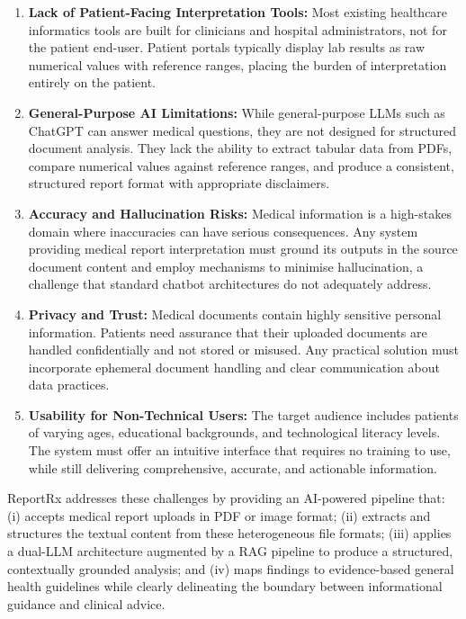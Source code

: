 \documentclass[12pt,a4paper]{report}
\begin{document}
\begin{enumerate}
    \item \textbf{Lack of Patient-Facing Interpretation Tools:} Most existing healthcare informatics tools are built for clinicians and hospital administrators, not for the patient end-user. Patient portals typically display lab results as raw numerical values with reference ranges, placing the burden of interpretation entirely on the patient.
    \item \textbf{General-Purpose AI Limitations:} While general-purpose LLMs such as ChatGPT can answer medical questions, they are not designed for structured document analysis. They lack the ability to extract tabular data from PDFs, compare numerical values against reference ranges, and produce a consistent, structured report format with appropriate disclaimers.
    \item \textbf{Accuracy and Hallucination Risks:} Medical information is a high-stakes domain where inaccuracies can have serious consequences. Any system providing medical report interpretation must ground its outputs in the source document content and employ mechanisms to minimise hallucination, a challenge that standard chatbot architectures do not adequately address.
    \item \textbf{Privacy and Trust:} Medical documents contain highly sensitive personal information. Patients need assurance that their uploaded documents are handled confidentially and not stored or misused. Any practical solution must incorporate ephemeral document handling and clear communication about data practices.
    \item \textbf{Usability for Non-Technical Users:} The target audience includes patients of varying ages, educational backgrounds, and technological literacy levels. The system must offer an intuitive interface that requires no training to use, while still delivering comprehensive, accurate, and actionable information.
\end{enumerate}

ReportRx addresses these challenges by providing an AI-powered pipeline that: (i) accepts medical report uploads in PDF or image format; (ii) extracts and structures the textual content from these heterogeneous file formats; (iii) applies a dual-LLM architecture augmented by a RAG pipeline to produce a structured, contextually grounded analysis; and (iv) maps findings to evidence-based general health guidelines while clearly delineating the boundary between informational guidance and clinical advice.
\end{document}
